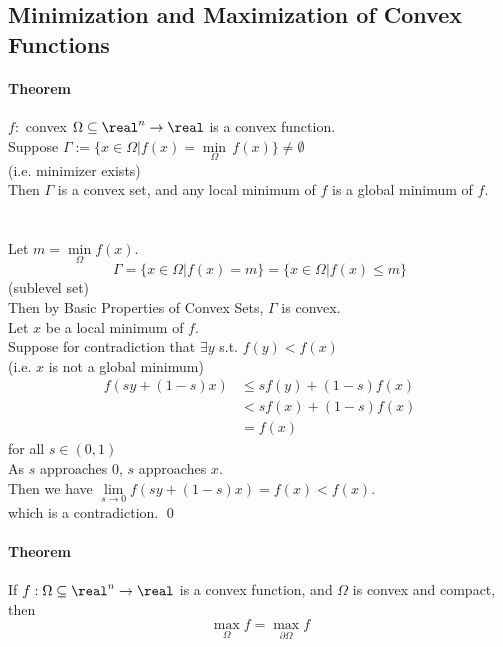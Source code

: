 \documentclass[11pt]{article}
\begin{document}
\subsection{Minimization and Maximization of Convex Functions}
\paragraph{Theorem}
$f:$ convex $\Omega \subseteq \real^n \rightarrow \real$ is a convex function. \\
Suppose $\Gamma := \{ x \in \Omega | f(x) = \underset{\Omega}{\min} \, f(x)\} \neq \emptyset$\\
(i.e. minimizer exists) \\
Then $\Gamma$ is a convex set, and any local minimum of $f$ is a global minimum of $f$. \\
 \\\\
Let $m = \underset{\Omega}{\min} f(x)$.
$$\Gamma = \{ x \in \Omega | f(x) = m\} = \{ x \in \Omega | f(x) \leq m \}$$
(sublevel set) \\
Then by Basic Properties of Convex Sets, $\Gamma$ is convex. \\
Let $x$ be a local minimum of $f$.\\
Suppose for contradiction that $\exists y$ s.t. $f(y) < f(x)$ \\
(i.e. $x$ is not a global minimum)
\begin{align*}
	f(sy + (1-s)x) &\leq sf(y) + (1-s)f(x) \\
	&< sf(x) + (1-s)f(x) \tag{$f(y) < f(x)$}\\
	&= f(x)
\end{align*}
for all $s \in (0,1)$ \\
As $s$ approaches 0, $s$ approaches $x$. \\
Then we have
$\underset{s \rightarrow 0}{\lim} f(sy + (1-s)x) = f(x) < f(x)$.\\
which is a contradiction. \qed


\paragraph{Theorem}
If $f: \Omega \subseteq \real^n \rightarrow \real$ is a convex function, and $\Omega$ is convex and compact, then $$\underset{\Omega}{\max} f = \underset{\partial \Omega}{\max} f$$
\end{document}
